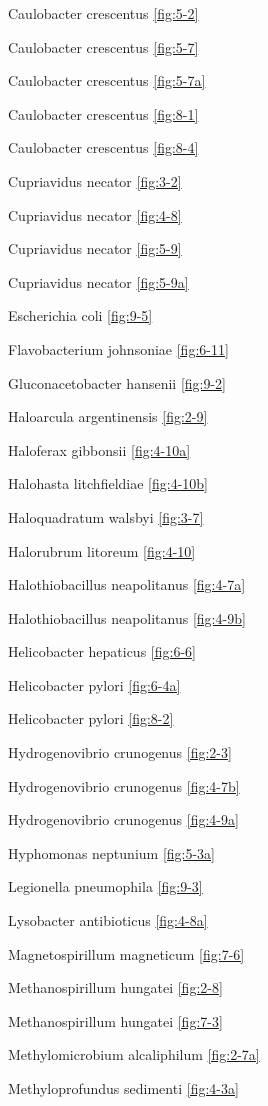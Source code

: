 \documentclass[]{tufte-book}
\begin{document}
Caulobacter crescentus \ref{fig:5-2}

Caulobacter crescentus \ref{fig:5-7}

Caulobacter crescentus \ref{fig:5-7a}

Caulobacter crescentus \ref{fig:8-1}

Caulobacter crescentus \ref{fig:8-4}

Cupriavidus necator \ref{fig:3-2}

Cupriavidus necator \ref{fig:4-8}

Cupriavidus necator \ref{fig:5-9}

Cupriavidus necator \ref{fig:5-9a}

Escherichia coli \ref{fig:9-5}

Flavobacterium johnsoniae \ref{fig:6-11}

Gluconacetobacter hansenii \ref{fig:9-2}

Haloarcula argentinensis \ref{fig:2-9}

Haloferax gibbonsii \ref{fig:4-10a}

Halohasta litchfieldiae \ref{fig:4-10b}

Haloquadratum walsbyi \ref{fig:3-7}

Halorubrum litoreum \ref{fig:4-10}

Halothiobacillus neapolitanus \ref{fig:4-7a}

Halothiobacillus neapolitanus \ref{fig:4-9b}

Helicobacter hepaticus \ref{fig:6-6}

Helicobacter pylori \ref{fig:6-4a}

Helicobacter pylori \ref{fig:8-2}

Hydrogenovibrio crunogenus \ref{fig:2-3}

Hydrogenovibrio crunogenus \ref{fig:4-7b}

Hydrogenovibrio crunogenus \ref{fig:4-9a}

Hyphomonas neptunium \ref{fig:5-3a}

Legionella pneumophila \ref{fig:9-3}

Lysobacter antibioticus \ref{fig:4-8a}

Magnetospirillum magneticum \ref{fig:7-6}

Methanospirillum hungatei \ref{fig:2-8}

Methanospirillum hungatei \ref{fig:7-3}

Methylomicrobium alcaliphilum \ref{fig:2-7a}

Methyloprofundus sedimenti \ref{fig:4-3a}
\end{document}
